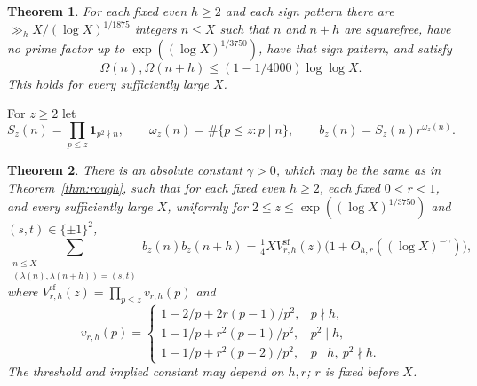 \documentclass[11pt]{article}
\newtheorem{theorem}{Theorem}[section]
\theoremstyle{definition}
\newcommand{\ind}{\mathbf 1}
\theoremstyle{remark}
\numberwithin{equation}{section}
\newcommand{\sfw}{\mathrm{sf}}
\begin{document}
\begin{theorem}\label{thm:omega-consumer}
For each fixed even $h\ge2$ and each sign pattern there are $\gg_h X/(\log X)^{1/1875}$ integers $n\le X$ such that
$n$ and $n+h$ are squarefree, have no prime factor up to $\exp((\log X)^{1/3750})$, have that sign pattern, and satisfy
\begin{equation}\label{eq:hard-omega}
 \Omega(n),\Omega(n+h)\le(1-1/4000)\log\log X.
\end{equation}
This holds for every sufficiently large $X$.
\end{theorem}

For $z\ge2$ let
\begin{equation}\label{eq:soft-def}
 S_z(n)=\prod_{p\le z}\ind_{p^2\nmid n},\qquad
 \omega_z(n)=\#\{p\le z:p\mid n\},\qquad b_z(n)=S_z(n)r^{\omega_z(n)}.
\end{equation}
\begin{theorem}\label{thm:soft}
There is an absolute constant $\gamma>0$, which may be the same as in Theorem~\ref{thm:rough}, such that for each
fixed even $h\ge2$, each fixed $0<r<1$, and every sufficiently large $X$, uniformly for
$2\le z\le\exp((\log X)^{1/3750})$ and $(s,t)\in\{\pm1\}^2$,
\begin{equation}\label{eq:soft-main}
 \sum_{\substack{n\le X\\(\lambda(n),\lambda(n+h))=(s,t)}}b_z(n)b_z(n+h)
 =\tfrac14X V^{\sfw}_{r,h}(z)\bigl(1+O_{h,r}((\log X)^{-\gamma})\bigr),
\end{equation}
where $V^{\sfw}_{r,h}(z)=\prod_{p\le z}v_{r,h}(p)$ and
\begin{equation}\label{eq:soft-local}
 v_{r,h}(p)=\begin{cases}
 1-2/p+2r(p-1)/p^2,&p\nmid h,\\
 1-1/p+r^2(p-1)/p^2,&p^2\mid h,\\
 1-1/p+r^2(p-2)/p^2,&p\mid h,\ p^2\nmid h.
 \end{cases}
\end{equation}
The threshold and implied constant may depend on $h,r$; $r$ is fixed before $X$.
\end{theorem}
\end{document}
